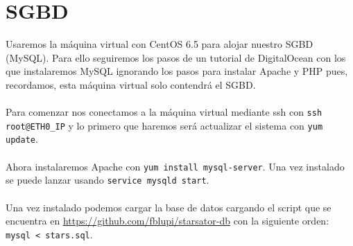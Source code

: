 \section{SGBD}

Usaremos la máquina virtual con CentOS 6.5 para alojar nuestro SGBD (MySQL). Para ello seguiremos los pasos de un tutorial de DigitalOcean \cite{InstallLAMPCentos6.5} con los que instalaremos MySQL ignorando los pasos para instalar Apache y PHP pues, recordamos, esta máquina virtual solo contendrá el SGBD.
\\ \\
Para comenzar nos conectamos a la máquina virtual mediante ssh con \texttt{ssh root@ETH0\_IP} y lo primero que haremos será actualizar el sistema con \texttt{yum update}.
\\ \\
Ahora instalaremos Apache con \texttt{yum install mysql-server}. Una vez instalado se puede lanzar usando \texttt{service mysqld start}.
\\ \\
Una vez instalado podemos cargar la base de datos cargando el script que se encuentra en \url{https://github.com/fblupi/starsator-db} con la siguiente orden: \texttt{mysql < stars.sql}.


\newpage


